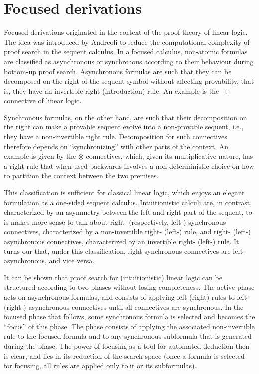 \section{Focused derivations}

Focused derivations originated in the context of the proof theory of linear
logic. The idea was introduced by Andreoli \cite{andreoli92} to reduce the
computational complexity of proof search in the sequent calculus.
In a focused calculus, non-atomic formulas are classified as asynchronous or
synchronous according to their behaviour during bottom-up proof search.
Asynchronous formulas are such that they can be decomposed on the right of the
sequent symbol without affecting provability, that is, they have an invertible
right (introduction) rule. An example is the $\mathbin{{-}\mkern-3.5mu{\circ}}$ connective of linear logic.

Synchronous formulas, on the other hand, are such that their decomposition on
the right can make a provable sequent evolve into a non-provable sequent, i.e.,
they have a non-invertible right rule. Decomposition for such connectives
therefore depends on ``synchronizing'' with other parts of the context.  An
example is given by the $\otimes$ connectives, which, given its multiplicative
nature, has a right rule that when used backwards involves a non-deterministic
choice on how to partition the context between the two premises.

This classification is sufficient for classical linear logic, which enjoys an
elegant formulation as a one-sided sequent calculus.  Intuitionistic calculi
are, in contrast, characterized by an asymmetry between the left and right part
of the sequent, to is makes more sense to talk about right- (respectively,
left-) synchronous connectives, characterized by a non-invertible right- (left-)
rule, and right- (left-) asynchronous connectives, characterized by an
invertible right- (left-) rule.  It turns our that, under this classification,
right-synchronous connectives are left-asynchronous, and vice versa.

It can be shown that proof search for (intuitionistic) linear logic can be
structured according to two phases without losing completeness. The active phase
acts on asynchronous formulas, and consists of applying left (right) rules to
left- (right-) asynchronous connectives until all connectives are synchronous.
In the focused phase that follows, some synchronous formula is selected and
becomes the ``focus'' of this phase. The phase consists of applying the
associated non-invertible rule to the focused formula and to any synchronous
subformula that is generated during the phase.
The power of focusing as a tool for automated deduction then is clear, and lies
in its reduction of the search space (once a formula is selected for focusing,
all rules are applied only to it or its subformulas).

